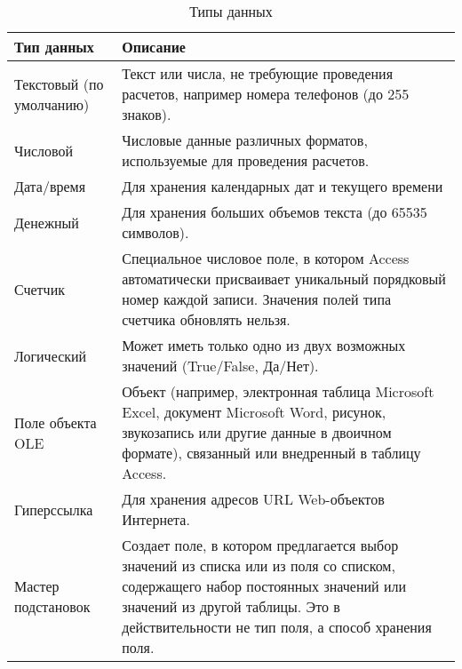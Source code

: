 \begin{xltabular}[h]{\textwidth}{|p{0.2 \textwidth}|X|}
    \caption{Типы данных\label{tab:data-types}} \\
    \hline
    \textbf{Тип данных} & \textbf{Описание} \\
    \hline \endhead
    Текстовый (по умолчанию) & Текст или числа, не требующие проведения расчетов, например номера телефонов (до 255 знаков). \\ \hline
    Числовой & Числовые данные различных форматов, используемые для проведения расчетов. \\ \hline
    Дата/время & Для хранения календарных дат и текущего времени \\ \hline
    Денежный & Для хранения больших объемов текста (до 65535 символов). \\ \hline
    Счетчик & Специальное числовое поле, в котором Access автоматически присваивает уникальный порядковый номер каждой записи. Значения полей типа счетчика обновлять нельзя. \\ \hline
    Логический & Может иметь только одно из двух возможных значений (True/False, Да/Нет). \\ \hline
    Поле объекта OLE & Объект (например, электронная таблица Microsoft Excel, документ Microsoft Word, рисунок, звукозапись или другие данные в двоичном формате), связанный или внедренный в таблицу Access. \\ \hline
    Гиперссылка & Для хранения адресов URL Web-объектов Интернета. \\ \hline
    Мастер подстановок & Создает поле, в котором предлагается выбор значений из списка или из поля со списком, содержащего набор постоянных значений или значений из другой таблицы. Это в действительности не тип поля, а способ хранения поля. \\ \hline
\end{xltabular}


\renewcommand{\img}[2]{
    \begin{figure}[H]
        \center{\texttt{[image: screenshots/\#1]}}
        \caption{#2}
        \label{screen:#1}
    \end{figure}
}
\newcommand{\longimg}[2]{
    \begin{figure}[H]
        \center{\texttt{[image: screenshots/\#1]}}
        \caption{#2}
        \label{screen:#1}
    \end{figure}
}



